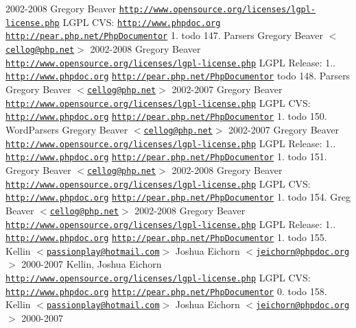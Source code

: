 {{{2002-\/2008 \-Gregory \-Beaver  \href{http://www.opensource.org/licenses/lgpl-license.php}{\tt http\-://www.\-opensource.\-org/licenses/lgpl-\/license.\-php} \-L\-G\-P\-L  \-C\-V\-S\-:   \href{http://www.phpdoc.org}{\tt http\-://www.\-phpdoc.\-org}  \href{http://pear.php.net/PhpDocumentor}{\tt http\-://pear.\-php.\-net/\-Php\-Documentor}  1.  todo 147.   \-Parsers  \-Gregory \-Beaver $<$\href{mailto:cellog@php.net}{\tt cellog@php.\-net}$>$  2002-\/2008 \-Gregory \-Beaver  \href{http://www.opensource.org/licenses/lgpl-license.php}{\tt http\-://www.\-opensource.\-org/licenses/lgpl-\/license.\-php} \-L\-G\-P\-L  \-Release\-: 1..  \href{http://www.phpdoc.org}{\tt http\-://www.\-phpdoc.\-org}  \href{http://pear.php.net/PhpDocumentor}{\tt http\-://pear.\-php.\-net/\-Php\-Documentor}  todo 148.   \-Parsers  \-Gregory \-Beaver $<$\href{mailto:cellog@php.net}{\tt cellog@php.\-net}$>$  2002-\/2007 \-Gregory \-Beaver  \href{http://www.opensource.org/licenses/lgpl-license.php}{\tt http\-://www.\-opensource.\-org/licenses/lgpl-\/license.\-php} \-L\-G\-P\-L  \-C\-V\-S\-:   \href{http://www.phpdoc.org}{\tt http\-://www.\-phpdoc.\-org}  \href{http://pear.php.net/PhpDocumentor}{\tt http\-://pear.\-php.\-net/\-Php\-Documentor}  1.  todo 150.   \-Word\-Parsers  \-Gregory \-Beaver $<$\href{mailto:cellog@php.net}{\tt cellog@php.\-net}$>$  2002-\/2007 \-Gregory \-Beaver  \href{http://www.opensource.org/licenses/lgpl-license.php}{\tt http\-://www.\-opensource.\-org/licenses/lgpl-\/license.\-php} \-L\-G\-P\-L  \-Release\-: 1..  \href{http://www.phpdoc.org}{\tt http\-://www.\-phpdoc.\-org}  \href{http://pear.php.net/PhpDocumentor}{\tt http\-://pear.\-php.\-net/\-Php\-Documentor}  1.  todo 151.   \-Gregory \-Beaver $<$\href{mailto:cellog@php.net}{\tt cellog@php.\-net}$>$  2002-\/2008 \-Gregory \-Beaver  \href{http://www.opensource.org/licenses/lgpl-license.php}{\tt http\-://www.\-opensource.\-org/licenses/lgpl-\/license.\-php} \-L\-G\-P\-L  \-C\-V\-S\-:   \href{http://www.phpdoc.org}{\tt http\-://www.\-phpdoc.\-org}  \href{http://pear.php.net/PhpDocumentor}{\tt http\-://pear.\-php.\-net/\-Php\-Documentor}  1.  todo 154.   \-Greg \-Beaver $<$\href{mailto:cellog@php.net}{\tt cellog@php.\-net}$>$  2002-\/2008 \-Gregory \-Beaver  \href{http://www.opensource.org/licenses/lgpl-license.php}{\tt http\-://www.\-opensource.\-org/licenses/lgpl-\/license.\-php} \-L\-G\-P\-L  \-Release\-: 1..  \href{http://www.phpdoc.org}{\tt http\-://www.\-phpdoc.\-org}  \href{http://pear.php.net/PhpDocumentor}{\tt http\-://pear.\-php.\-net/\-Php\-Documentor}  1.  todo 155.   \-Kellin $<$\href{mailto:passionplay@hotmail.com}{\tt passionplay@hotmail.\-com}$>$  \-Joshua \-Eichorn $<$\href{mailto:jeichorn@phpdoc.org}{\tt jeichorn@phpdoc.\-org}$>$  2000-\/2007 \-Kellin, \-Joshua \-Eichorn  \href{http://www.opensource.org/licenses/lgpl-license.php}{\tt http\-://www.\-opensource.\-org/licenses/lgpl-\/license.\-php} \-L\-G\-P\-L  \-C\-V\-S\-:   \href{http://www.phpdoc.org}{\tt http\-://www.\-phpdoc.\-org}  \href{http://pear.php.net/PhpDocumentor}{\tt http\-://pear.\-php.\-net/\-Php\-Documentor}  0.  todo 158.   \-Kellin $<$\href{mailto:passionplay@hotmail.com}{\tt passionplay@hotmail.\-com}$>$  \-Joshua \-Eichorn $<$\href{mailto:jeichorn@phpdoc.org}{\tt jeichorn@phpdoc.\-org}$>$  2000-\/2007 }}}
